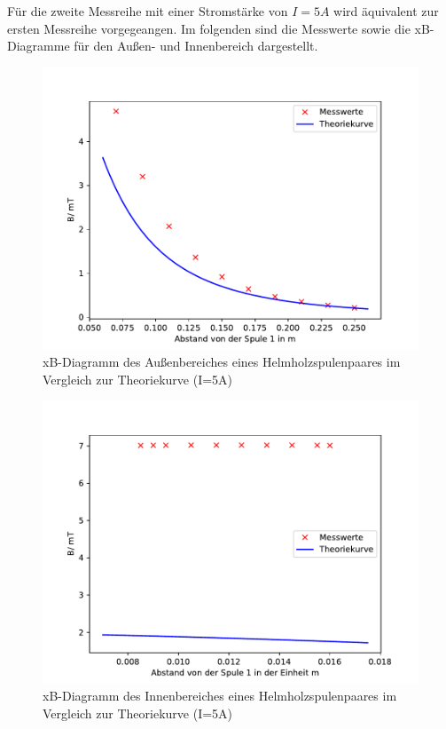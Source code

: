 Für die zweite Messreihe mit einer Stromstärke von
$I=5A$ wird äquivalent zur ersten Messreihe vorgegeangen.
Im folgenden sind die Messwerte sowie die xB-Diagramme
für den Außen- und Innenbereich dargestellt.


\begin{figure}[H]
  \centering
  \includegraphics{Helmholz2.pdf}
  \caption{xB-Diagramm des Außenbereiches eines
  Helmholzspulenpaares im Vergleich zur Theoriekurve
  (I=5A)}
  \label{fig:Helmholz2}
\end{figure}

\begin{figure}[H]
  \centering
  \includegraphics{Helmholz2I.pdf}
  \caption{xB-Diagramm des Innenbereiches eines
  Helmholzspulenpaares im Vergleich zur Theoriekurve
  (I=5A)}
  \label{fif:Helmholz2I}
\end{figure}



